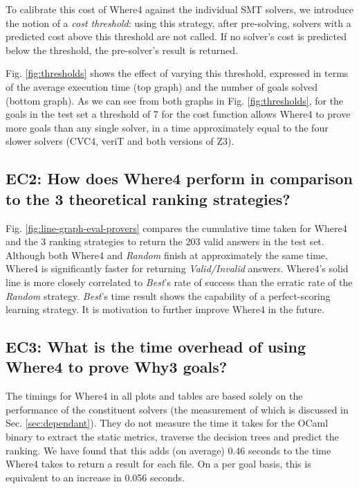 \documentclass[submission,copyright,creativecommons]{eptcs}
\begin{document}
To calibrate this cost of \textsf{Where4} against the individual SMT solvers, we introduce the notion of a \textit{cost threshold}: using this strategy, after pre-solving, solvers with a predicted cost above this threshold are not called. If no solver's cost is predicted below the threshold, the pre-solver's result is returned.  

Fig. \ref{fig:thresholds} shows the effect of varying this threshold, expressed in terms of the average execution time (top graph) and the number of goals solved (bottom graph).  As we can see from both graphs in Fig. \ref{fig:thresholds}, for the goals in the test set a threshold of 7 for the cost function allows \textsf{Where4} to prove more goals than any single solver, in a time approximately equal to the four slower solvers (CVC4, veriT and both versions of Z3). 

\subsection{EC2: How does \textsf{Where4} perform in comparison to the 3 theoretical ranking strategies?}
Fig. \ref{fig:line-graph-eval-provers} compares the cumulative time taken for \textsf{Where4} and the 3 ranking strategies to return the 203 valid answers in the test set. Although both \textsf{Where4} and \textit{Random} finish at approximately the same time, \textsf{Where4} is significantly faster for returning \textit{Valid/Invalid} answers. \textsf{Where4}'s solid line is more closely correlated to \textit{Best}'s rate of success than the erratic rate of the \textit{Random} strategy. \textit{Best}'s time result shows the capability of a perfect-scoring learning strategy. It is motivation to further improve \textsf{Where4} in the future.   

\subsection{EC3: What is the time overhead of using \textsf{Where4} to prove \textsf{Why3} goals?}The timings for \textsf{Where4} in all plots and tables are based solely on the performance of the constituent solvers (the measurement of which is discussed in Sec. \ref{sec:dependant}). They do not measure the time it takes for the OCaml binary to extract the static metrics, traverse the decision trees and predict the ranking. We have found that this adds (on average) 0.46 seconds to the time \textsf{Where4} takes to return a result for each file. On a per goal basis, this is equivalent to an increase in 0.056 seconds. 
\end{document}
